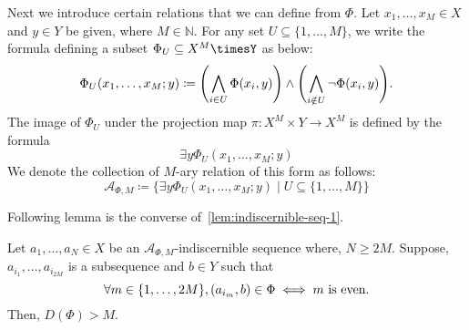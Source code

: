 Next we introduce certain relations that we can define from $\Phi$. Let $x_1, \dots, x_M \in X$ and $y \in Y$ be given, where $M \in \mathbb{N}$. For any set $U \subseteq \{1, \dots, M\}$, we write the formula defining a subset $\Phi_{U} \subseteq X^{M}\timesY$ as below:
\begin{equation}{\label{eq:new-way-of-relation}}
    \Phi_{U}(x_1, \dots, x_M; y) \coloneq \Biggl( \bigwedge_{i \in U} \Phi(x_i, y) \Biggr) \land \Biggl( \bigwedge_{i \notin U} \neg\Phi(x_i, y)\Biggr).
\end{equation}
The image of $\Phi_{U}$ under the projection map $\pi: X^M\times Y \to X^M$ is defined by the formula
\[
    \exists y \Phi_{U}(x_1, \dots, x_M; y)
\]
We denote the collection of $M$-ary relation of this form as follows:
\[
    \mathcal{A}_{\Phi, M} \coloneq \{\exists y \Phi_{U}(x_1, \dots, x_M; y) \mid U \subseteq \{1, \dots, M\} \}
\]

Following lemma is the converse of~\ref{lem:indiscernible-seq-1}.

\begin{lemma}{\label{lem:indiscernible-seq-2}}
    Let $a_1, \dots, a_N \in X$ be an $\mathcal{A}_{\Phi, M}$-indiscernible sequence where, $N \geq 2M$. Suppose, $a_{i_1}, \dots, a_{i_{2M}}$ is a subsequence and $b \in Y$ such that
    \begin{equation}{\label{eq:lem-indiscerible-seq-2-asumption}}
        \forall m \in \{1, \dots, 2M\}, (a_{i_m}, b) \in \Phi \iff m \text{ is even}.
    \end{equation}
    Then, $D(\Phi) > M$.
\end{lemma}

